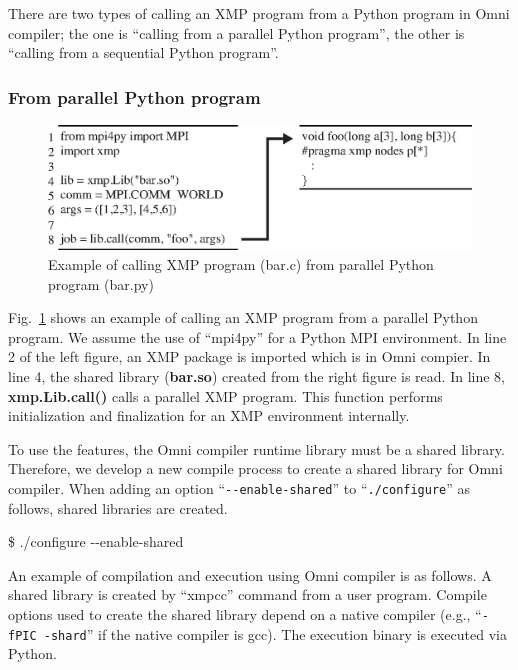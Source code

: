 \documentclass[graybox]{svmult}
\begin{document}
There are two types of calling an XMP program from a Python program in Omni compiler;
 the one is ``calling from a parallel Python program'', the other is ``calling from a sequential Python program''.

\subsubsection{From parallel Python program}
\begin{figure}[h]
\sidecaption
\includegraphics[scale=.82]{img/program3.eps}
\caption{Example of calling XMP program (bar.c) from parallel Python program (bar.py)\cite{pgas-ei}} \label{fig:program3}
\end{figure}

Fig.~\ref{fig:program3} shows an example of calling an XMP program from a parallel Python program.
We assume the use of ``mpi4py'' for a Python MPI environment.
In line 2 of the left figure, an XMP package is imported which is in Omni compier.
In line 4, the shared library ({\bf bar.so}) created from the right figure is read.
In line 8, {\bf xmp.Lib.call()} calls a parallel XMP program.
This function performs initialization and finalization for an XMP environment internally.

To use the features, the Omni compiler runtime library must be a shared library. 
Therefore, we develop a new compile process to create a shared library for Omni compiler. 
When adding an option ``{\tt {-}{-}enable-shared}'' to ``{\tt ./configure}'' as follows, shared libraries are created.

\begin{svgraybox}
\$ ./configure {-}{-}enable-shared
\end{svgraybox}

An example of compilation and execution using Omni compiler is as follows. 
A shared library is created by ``xmpcc'' command from a user program. 
Compile options used to create the shared library depend on a native compiler (e.g., ``{\tt -fPIC -shard}'' if the native compiler is gcc). 
The execution binary is executed via Python.
\end{document}
